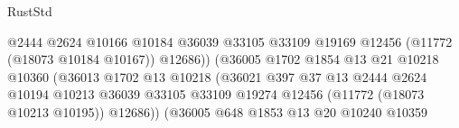 \begin{lexlean}{RustStd}
\begin{coremodule}
                                                    @2444
                                                    @2624
                                                    @10166
                                                    @10184
                                                    @36039
                                                    @33105
                                                    @33109
                                                    @19169
                                                    @12456
                                                    (@11772 (@18073 @10184 @10167))
                                                    @12686))
                                                (@36005
                                                  @1702
                                                  @1854
                                                  @13
                                                  @21
                                                  @10218
                                                  @10360
                                                  (@36013
                                                    @1702
                                                    @13
                                                    @10218
                                                    (@36021
                                                      @397
                                                      @37
                                                      @13
                                                      @2444
                                                      @2624
                                                      @10194
                                                      @10213
                                                      @36039
                                                      @33105
                                                      @33109
                                                      @19274
                                                      @12456
                                                      (@11772 (@18073 @10213 @10195))
                                                      @12686))
                                                  (@36005
                                                    @648
                                                    @1853
                                                    @13
                                                    @20
                                                    @10240
                                                    @10359

\end{coremodule}
\end{lexlean}
